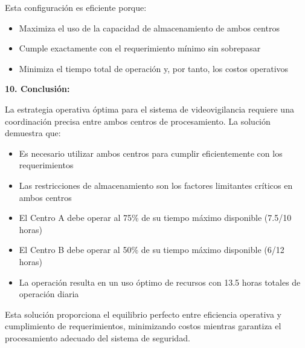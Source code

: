 \documentclass[12pt,a4paper]{article}
\begin{document}
Esta configuración es eficiente porque:
\begin{itemize}
\item Maximiza el uso de la capacidad de almacenamiento de ambos centros
\item Cumple exactamente con el requerimiento mínimo sin sobrepasar
\item Minimiza el tiempo total de operación y, por tanto, los costos operativos
\end{itemize}

\textbf{10. Conclusión:}

La estrategia operativa óptima para el sistema de videovigilancia requiere una coordinación precisa entre ambos centros de procesamiento. La solución demuestra que:

\begin{itemize}
\item Es necesario utilizar ambos centros para cumplir eficientemente con los requerimientos
\item Las restricciones de almacenamiento son los factores limitantes críticos en ambos centros
\item El Centro A debe operar al 75\% de su tiempo máximo disponible (7.5/10 horas)
\item El Centro B debe operar al 50\% de su tiempo máximo disponible (6/12 horas)
\item La operación resulta en un uso óptimo de recursos con 13.5 horas totales de operación diaria
\end{itemize}

Esta solución proporciona el equilibrio perfecto entre eficiencia operativa y cumplimiento de requerimientos, minimizando costos mientras garantiza el procesamiento adecuado del sistema de seguridad.
\end{document}
